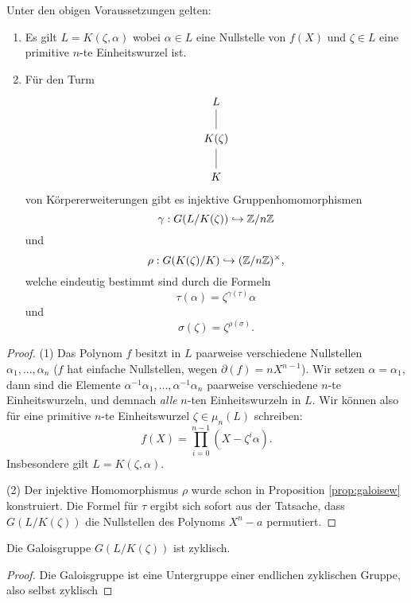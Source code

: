 \documentclass{book}
\begin{document}
\begin{prop}
    \label{prop:radgalois} Unter den obigen Voraussetzungen gelten:
    \begin{enumerate}
        \item Es gilt $L = K(\zeta, \alpha)$ wobei $\alpha \in L$ eine
            Nullstelle von $f(X)$ und $\zeta \in L$ eine primitive $n$-te
            Einheitswurzel ist. 
        \item Für den Turm
            \[
            \begin{tikzcd}
                L \ar[dash]{d} \\
                K(\zeta)\ar[dash]{d}\\
                K
            \end{tikzcd}
            \]
            von Körpererweiterungen gibt es injektive Gruppenhomomorphismen
            \[
                \gamma: G(L/K(\zeta)) \hookrightarrow \mathbb{Z}/n\mathbb{Z}
            \]
            und
            \[
                \rho: G(K(\zeta)/K) \hookrightarrow (\mathbb{Z}/n\mathbb{Z})^{\times},
            \]
            welche eindeutig bestimmt sind durch die Formeln
            \[
                \tau(\alpha) = \zeta^{\gamma(\tau)} \alpha
            \]
            und
            \[
                \sigma(\zeta) = \zeta^{\rho(\sigma)}.
            \]
    \end{enumerate}
\end{prop}
\begin{proof}
    (1) Das Polynom $f$ besitzt in $L$ paarweise verschiedene Nullstellen
    $\alpha_1, ..., \alpha_n$ ($f$ hat einfache Nullstellen, wegen $\partial(f)
    = n X^{n-1}$). Wir setzen $\alpha = \alpha_1$, dann sind die Elemente
    $\alpha^{-1} \alpha_1, ..., \alpha^{-1} \alpha_n$ paarweise verschiedene
    $n$-te Einheitswurzeln, und demnach {\em alle} $n$-ten Einheitswurzeln in
    $L$. Wir können also für eine primitive $n$-te Einheitswurzel $\zeta \in
    \mu_n(L)$ schreiben:
    \[
        f(X) = \prod_{i = 0}^{n-1} (X - \zeta^i \alpha).
    \]
    Insbesondere gilt $L = K(\zeta,\alpha)$. 

    (2) Der injektive Homomorphismus $\rho$ wurde schon in Proposition
    \ref{prop:galoisew} konstruiert. Die Formel für $\tau$ ergibt sich sofort
    aus der Tatsache, dass $G(L/K(\zeta))$ die Nullstellen des Polynoms $X^n -
    a$ permutiert. 
\end{proof}

\begin{cor}
    \label{cor:galzyklisch}
    Die Galoisgruppe $G(L/K(\zeta))$ ist zyklisch.  
\end{cor}
\begin{proof}
    Die Galoisgruppe ist eine Untergruppe einer endlichen zyklischen Gruppe, also selbst
    zyklisch 
\end{proof}
\end{document}
